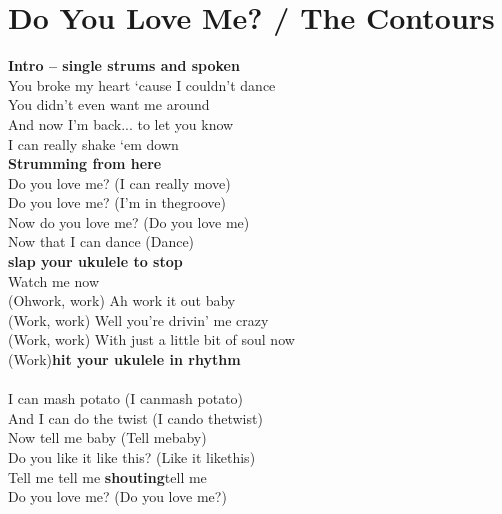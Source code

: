 \section{Do You Love Me? / The Contours}\label{sec:doyouloveme}

\Fmajor
\BflatMajor
\Cmajor
\Dminor
\BflatMinor


\textbf{Intro – single strums and spoken}\\
 You broke my heart ‘cause I couldn’t dance\\
You didn’t even want me around\\
And now I’m back... to let you know\\
I can really shake ‘em down\\
\textbf{Strumming from here}\\
Do you love me? (I can really move)\\
Do you love me? (I’m in thegroove)\\
Now do you love me? (Do you love me)\\
Now that I can dance (Dance)\\
\textbf{slap your ukulele to stop}\\
Watch me now\\
(Ohwork, work) Ah work it out baby\\
(Work, work) Well you’re drivin’ me crazy\\
(Work, work) With just a little bit of soul now\\
(Work)\textbf{hit your ukulele in rhythm}\\
\\
I can mash potato (I canmash potato)\\
And I can do the twist (I cando thetwist)\\
Now tell me baby (Tell mebaby)\\
Do you like it like this? (Like it likethis)\\
Tell me tell me \textbf{shouting}tell me\\
Do you love me? (Do you love me?)\\
